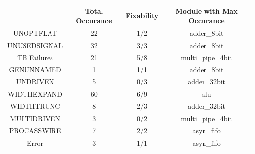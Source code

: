 \begin{tabular}{c|c|c|c}
\toprule
 & \bfseries Total Occurance & \bfseries Fixability & \bfseries Module with Max Occurance \\
\midrule
UNOPTFLAT & 22 & 1/2 & adder\_8bit \\ \midrule
UNUSEDSIGNAL & 32 & \color{black} {\cellcolor{lightblue}} 3/3 & adder\_8bit \\ \midrule
TB Failures & 21 & 5/8 & multi\_pipe\_4bit \\ \midrule
GENUNNAMED & \color{black} {\cellcolor{lightgreen}} 1 & \color{black} {\cellcolor{lightblue}} 1/1 & adder\_8bit \\ \midrule
UNDRIVEN & 5 & \color{black} {\cellcolor{lightgreen}} 0/3 & adder\_32bit \\ \midrule
WIDTHEXPAND & \color{black} {\cellcolor{lightblue}} 60 & 6/9 & alu \\ \midrule
WIDTHTRUNC & 8 & 2/3 & adder\_32bit \\ \midrule
MULTIDRIVEN & 3 & \color{black} {\cellcolor{lightgreen}} 0/2 & multi\_pipe\_4bit \\ \midrule
PROCASSWIRE & 7 & \color{black} {\cellcolor{lightblue}} 2/2 & asyn\_fifo \\ \midrule
Error & 3 & \color{black} {\cellcolor{lightblue}} 1/1 & asyn\_fifo \\
\bottomrule
\end{tabular}
